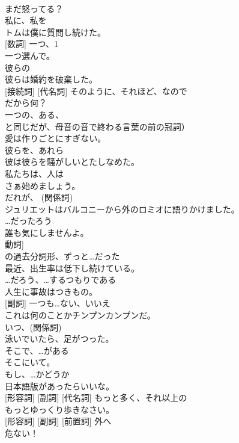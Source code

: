 \documentclass[8pt]{extreport}
\begin{document}
\begin{CJK}{UTF8}{min}
\\	まだ怒ってる？	
\\	[代名詞]	私に、私を	
\\	トムは僕に質問し続けた。	
\\	[名詞] [数詞]	一つ、1	
\\	一つ選んで。	
\\	[限定詞]	彼らの	
\\	彼らは婚約を破棄した。	
\\	[副詞] [接続詞] [代名詞]	そのように、それほど、なので	
\\	だから何？	
\\	[冠詞]	一つの、ある、
\\	と同じだが、母音の音で終わる言葉の前の冠詞）	
\\	愛は作りごとにすぎない。	
\\	[代名詞]	彼らを、あれら	
\\	彼は彼らを騒がしいとたしなめた。	
\\	[代名詞]	私たちは、人は	
\\	さぁ始めましょう。	
\\	[代名詞]	だれが、 (関係詞)	
\\	ジュリエットはバルコニーから外のロミオに語りかけました。	
\\	[助動詞]	…だったろう	
\\	誰も気にしませんよ。	
\\	動詞]	
\\	の過去分詞形、ずっと…だった	
\\	最近、出生率は低下し続けている。	
\\	[助動詞]	…だろう、…するつもりである	
\\	人生に事故はつきもの。	
\\	[形容詞] [副詞]	一つも…ない、いいえ	
\\	これは何のことかチンプンカンプンだ。	
\\	[代名詞]	いつ、(関係詞)	
\\	泳いでいたら、足がつった。	
\\	[副詞]	そこで、…がある	
\\	そこにいて。	
\\	[接続詞]	もし、…かどうか	
\\	日本語版があったらいいな。	
\\	[名詞] [形容詞] [副詞] [代名詞]	もっと多く、それ以上の	
\\	もっとゆっくり歩きなさい。	
\\	[名詞] [形容詞] [副詞] [前置詞]	外へ	
\\	危ない！	

\end{CJK}
\end{document}
